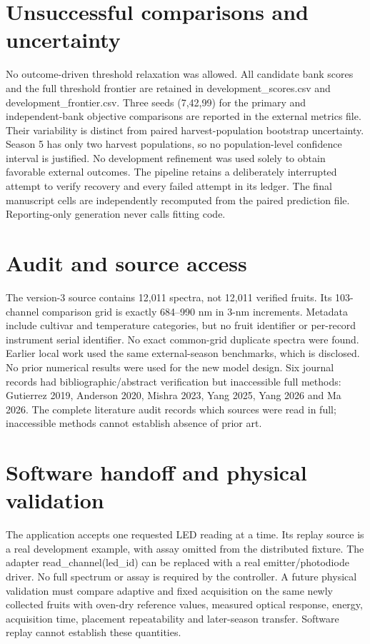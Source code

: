 \documentclass[10pt,a4paper]{article}
\begin{document}
\section{Unsuccessful comparisons and uncertainty}
No outcome-driven threshold relaxation was allowed. All candidate bank scores and the full threshold frontier are retained in development\_scores.csv and development\_frontier.csv.
Three seeds (7,42,99) for the primary and independent-bank objective comparisons are reported in the external metrics file.
Their variability is distinct from paired harvest-population bootstrap uncertainty. Season 5 has only two harvest populations, so no population-level confidence interval is justified.
No development refinement was used solely to obtain favorable external outcomes. The pipeline retains a deliberately interrupted attempt to verify recovery and every failed attempt in its ledger.
The final manuscript cells are independently recomputed from the paired prediction file. Reporting-only generation never calls fitting code.

\section{Audit and source access}
The version-3 source contains 12,011 spectra, not 12,011 verified fruits. Its 103-channel comparison grid is exactly 684--990 nm in 3-nm increments.
Metadata include cultivar and temperature categories, but no fruit identifier or per-record instrument serial identifier. No exact common-grid duplicate spectra were found.
Earlier local work used the same external-season benchmarks, which is disclosed. No prior numerical results were used for the new model design.
Six journal records had bibliographic/abstract verification but inaccessible full methods: Gutierrez 2019, Anderson 2020, Mishra 2023, Yang 2025, Yang 2026 and Ma 2026.
The complete literature audit records which sources were read in full; inaccessible methods cannot establish absence of prior art.

\section{Software handoff and physical validation}
The application accepts one requested LED reading at a time. Its replay source is a real development example, with assay omitted from the distributed fixture.
The adapter read\_channel(led\_id) can be replaced with a real emitter/photodiode driver. No full spectrum or assay is required by the controller.
A future physical validation must compare adaptive and fixed acquisition on the same newly collected fruits with oven-dry reference values,
measured optical response, energy, acquisition time, placement repeatability and later-season transfer. Software replay cannot establish these quantities.
\end{document}
